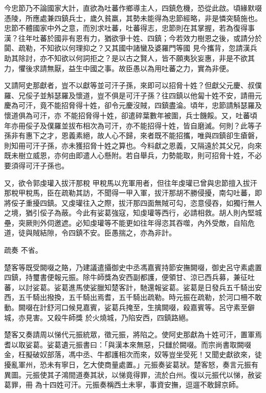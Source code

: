 \begin{pinyinscope}
 今忠節乃不論國家大計，直欲為吐蕃作鄉導主人，四鎮危機，恐從此啟。頃緣默啜憑陵，所應處兼四鎮兵士，歲久貧羸，其勢未能得為忠節經略，非是憐突騎施也。忠節不體國家中外之意，而別求吐蕃，吐蕃得志，忠節則在其掌握，若為復得事漢？往年吐蕃於國非有恩有力，猶欲爭十姓、四鎮；今若效力樹恩之後，或請分於闐、疏勒，不知欲以何理抑之？又其國中諸蠻及婆羅門等國
 見今攜背，忽請漢兵助其除討，亦不知欲以何詞拒之？是以古之賢人，皆不願夷狄妄惠，非是不欲其力，懼後求請無厭，益生中國之事。故臣愚以為用吐蕃之力，實為非便。



 又請阿史那獻者，豈不以獻等並可汗子孫，來即可以招脅十姓？但獻父元慶、叔僕羅、兄俀子並斛瑟羅及懷道，豈不俱是可汗子孫？往四鎮以他匐十姓不安，請冊元慶為可汗，竟不能招脅得十姓，卻令元慶沒賊，四鎮盡淪。頃年，忠節請斛瑟羅及懷道俱為可汗，亦
 不能招脅得十姓，卻遣碎葉數年被圍，兵士饑餒。又，吐蕃頃年亦冊俀子及僕羅並拔布相次為可汗，亦不能招得十姓，皆自磨滅。何則？此等子孫非有惠下之才，恩義素絕，故人心不歸，來者既不能招攜，唯與四鎮卻生瘡磐，則知冊可汗子孫，亦未獲招脅十姓之算也。今料獻之恩義，又隔遠於其父兄，向來既未樹立威恩，亦何由即遣人心懸附。若自舉兵，力勢能取，則可招脅十姓，不必要須得可汗子孫也。



 又，欲令郭虔瓘入拔汗那稅
 甲稅馬以充軍用者，但往年虔瓘已曾與忠節擅入拔汗那稅甲稅馬，臣在疏勒其訪，不聞得一甲入軍，拔汗那胡不勝侵擾，南勾吐蕃，即將俀子重擾四鎮。又虔瓘往入之際，拔汗那四面無賊可勾，恣意侵吞，如獨行無人之境，猶引俀子為蔽。今此有娑葛強寇，知虔瓘等西行，必請相救。胡人則內堅城壘，突厥則外伺邀遮。必知虔瓘等不能更如往年得恣其吞噬，內外受敵，自陷危道，徒與賊結隙，令四鎮不安。臣愚揣之，亦為非計。



 疏奏
 不省。



 楚客等既受闕啜之賂，乃建議遣攝御史中丞馮嘉賓持節安撫闕啜，御史呂守素處置四鎮，持璽書便報元振。除牛師獎為安西副都護，便領甘、涼已西兵募，兼征吐蕃，以討娑葛。娑葛進馬使娑臘知楚客計，馳還報娑葛。娑葛是日發兵五千騎出安西，五千騎出撥換，五千騎出焉耆，五千騎出疏勒。時元振在疏勒，於河口柵不敢動。闕啜在計舒河口候見嘉賓，娑葛兵掩至，生擒闕啜，殺嘉賓等。呂守素至僻城，亦見害。又殺牛師獎
 於火燒城，乃陷安西，四鎮路絕。



 楚客又奏請周以悌代元振統眾，徵元振，將陷之。使阿史那獻為十姓可汗，置軍焉耆以取娑葛。娑葛遺元振書曰：「與漢本來無惡，只讎於闕啜。而宗尚書取闕啜金，枉擬破奴部落，馮中丞、牛都護相次而來，奴等豈坐受死！又聞史獻欲來，徒擾亂軍州，恐未有寧日，乞大使商量處置。」元振奏娑葛狀。楚客怒，奏言元振有異圖。元振使其子鴻間道奏其狀，以悌竟得罪，流於白州。復以元振代以悌，赦娑葛罪，冊
 為十四姓可汗。元振奏稱西土未寧，事資安撫，逗遛不敢歸京師。




\end{pinyinscope}
